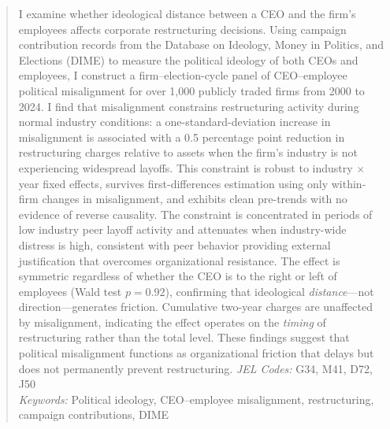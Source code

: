 
\begin{abstract}
\noindent I examine whether ideological distance between a CEO and the
firm's employees affects corporate restructuring decisions. Using campaign
contribution records from the Database on Ideology, Money in Politics, and
Elections (DIME) to measure the political ideology of both CEOs and
employees, I construct a firm--election-cycle panel of CEO--employee
political misalignment for over 1,000 publicly traded firms from 2000 to
2024. I find that misalignment constrains restructuring activity during
normal industry conditions: a one-standard-deviation increase in
misalignment is associated with a 0.5 percentage point reduction in
restructuring charges relative to assets when the firm's industry is not
experiencing widespread layoffs. This constraint is robust to industry
$\times$ year fixed effects, survives first-differences estimation using
only within-firm changes in misalignment, and exhibits clean pre-trends
with no evidence of reverse causality. The constraint is concentrated in
periods of low industry peer layoff activity and attenuates when
industry-wide distress is high, consistent with peer behavior providing
external justification that overcomes organizational resistance. The effect
is symmetric regardless of whether the CEO is to the right or left of
employees (Wald test $p = 0.92$), confirming that ideological
\textit{distance}---not direction---generates friction. Cumulative two-year
charges are unaffected by misalignment, indicating the effect operates on
the \textit{timing} of restructuring rather than the total level. These
findings suggest that political misalignment functions as organizational
friction that delays but does not permanently prevent restructuring.
\medskip
\noindent \textit{JEL Codes:} G34, M41, D72, J50 \\
\noindent \textit{Keywords:} Political ideology, CEO--employee misalignment,
restructuring, campaign contributions, DIME
\end{abstract}

